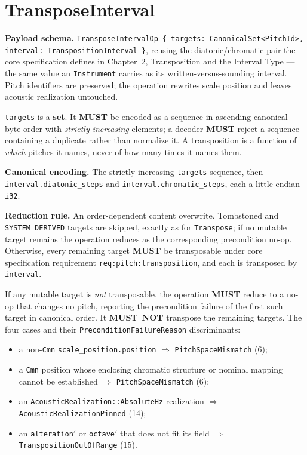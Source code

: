 \documentclass[11pt,letterpaper]{report}
\newcommand{\sectionsc}[1]{{\addfontfeatures{Letters=SmallCaps}#1}}
\newcounter{requirement}[chapter]
\newcommand{\MUST}{\textbf{MUST}}
\newcommand{\MUSTNOT}{\textbf{MUST}\nobreak\ \textbf{NOT}}
\begin{document}
\section{TransposeInterval}
\label{sec:k0:transpose-interval}

\textbf{Payload schema.} \texttt{TransposeIntervalOp \{ targets:
CanonicalSet<PitchId>, interval: TranspositionInterval \}}, reusing the
diatonic/chromatic pair the core specification defines in Chapter~2,
\sectionsc{Transposition and the Interval Type} --- the same value an
\texttt{Instrument} carries as its written-versus-sounding interval. Pitch
identifiers are preserved; the operation rewrites scale position and leaves
acoustic realization untouched.

\begin{requirement}
  \label{req:opcat:transpose-interval-targets}
  \texttt{targets} is a \textbf{set}. It \MUST{} be encoded as a sequence in
  ascending canonical-byte order with \emph{strictly increasing} elements; a
  decoder \MUST{} reject a sequence containing a duplicate rather than
  normalize it. A transposition is a function of \emph{which} pitches it names,
  never of how many times it names them.
\end{requirement}

\textbf{Canonical encoding.} The strictly-increasing \texttt{targets} sequence,
then \texttt{interval.diatonic\_steps} and \texttt{interval.chromatic\_steps},
each a little-endian \texttt{i32}.

\textbf{Reduction rule.} An order-dependent content overwrite. Tombstoned and
\texttt{SYSTEM\_DERIVED} targets are skipped, exactly as for \texttt{Transpose};
if no mutable target remains the operation reduces as the corresponding
precondition no-op. Otherwise, every remaining target \MUST{} be transposable
under core specification requirement \texttt{req:pitch:transposition}, and each
is transposed by \texttt{interval}.

\begin{requirement}
  \label{req:opcat:transpose-interval-atomic}
  If any mutable target is \emph{not} transposable, the operation \MUST{}
  reduce to a no-op that changes no pitch, reporting the precondition failure
  of the first such target in canonical order. It \MUSTNOT{} transpose the
  remaining targets. The four cases and their
  \texttt{PreconditionFailureReason} discriminants:
  \begin{itemize}
    \item a non-\texttt{Cmn} \texttt{scale\_position.position} $\Rightarrow$
      \texttt{PitchSpaceMismatch} (6);
    \item a \texttt{Cmn} position whose enclosing chromatic structure or
      nominal mapping cannot be established $\Rightarrow$
      \texttt{PitchSpaceMismatch} (6);
    \item an \texttt{AcousticRealization::AbsoluteHz} realization
      $\Rightarrow$ \texttt{AcousticRealizationPinned} (14);
    \item an \texttt{alteration}$'$ or \texttt{octave}$'$ that does not fit
      its field $\Rightarrow$ \texttt{TranspositionOutOfRange} (15).
  \end{itemize}
\end{requirement}
\end{document}
